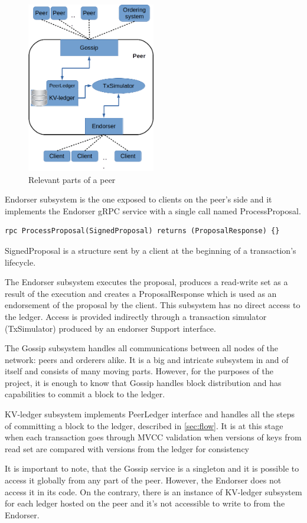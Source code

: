 \begin{figure}[hp]
\begin{center}
\includegraphics[width=0.5\textwidth]{figures/peer}
\end{center}
\caption{Relevant parts of a peer}
\label{fig:peer}
\end{figure}

Endorser subsystem is the one exposed to clients on the peer's side and it implements the Endorser gRPC service with a single call named ProcessProposal.
\begin{lstlisting}
rpc ProcessProposal(SignedProposal) returns (ProposalResponse) {}
\end{lstlisting}
SignedProposal is a structure sent by a client at the beginning of a transaction's lifecycle.

The Endorser subsystem executes the proposal, produces a read-write set as a result of the execution and creates a ProposalResponse which is used as an endorsement of the proposal by the client.  This subsystem has no direct access to the ledger. Access is provided indirectly through a transaction simulator (TxSimulator) produced by an endorser Support interface.

The Gossip subsystem handles all communications between all nodes of the network: peers and orderers alike. It is a big and intricate subsystem in and of itself and consists of many moving parts. However, for the purposes of the project, it is enough to know that Gossip handles block distribution and has capabilities to commit a block to the ledger.

KV-ledger subsystem implements PeerLedger interface and handles all the steps of committing a block to the ledger, described in \ref{sec:flow}. It is at this stage when each transaction goes through MVCC validation when versions of keys from read set are compared with versions from the ledger for consistency

It is important to note, that the Gossip service is a singleton and it is possible to access it globally from any part of the peer. However, the Endorser does not access it in its code. On the contrary, there is an instance of KV-ledger subsystem for each ledger hosted on the peer and it's not accessible to write to from the Endorser.
